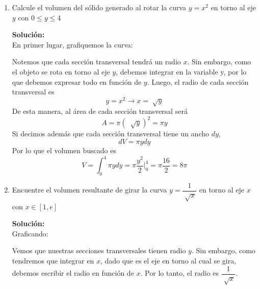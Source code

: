 \documentclass[12pt]{article}
\newenvironment{solucion}
{\begin{mdframed}[backgroundcolor=black!10]
		{\bf Solución:}\\
	}
	{
	\end{mdframed}
}
\newenvironment{preguntas}
{\begin{enumerate}\itemsep12pt
	}
	{
	\end{enumerate}
}
\newcommand{\ev}{\Big|}
\newcommand{\ra}{\rightarrow}
\begin{document}
\begin{preguntas}
\item Calcule el volumen del sólido generado al rotar la curva $y=x^2$ en torno al eje $y$ con $0 \leq y \leq 4$
\begin{solucion}
En primer lugar, grafiquemos la curva:
		\begin{center}
		\end{center}
	
		Notemos que cada sección transversal tendrá un radio $x$. Sin embargo, como el objeto se rota en torno al eje $y$, debemos integrar en la variable y, por lo que debemos expresar todo en función de $y$. Luego, el radio de cada sección transversal es 
		$$y = x^2 \ra x = \sqrt[]{y}$$
		De esta manera, al área de cada sección transversal será
		$$A = \pi (\ \sqrt[]{y})^2 = \pi y$$
		Si decimos además que cada sección transversal tiene un ancho $dy$,
		$$dV =  \pi y dy$$
	 	Por lo que el volumen buscado es
	 	$$V = \displaystyle \int_0^4 \pi y dy = \pi \dfrac{y^2}{2} \ev_0^4 = \pi \dfrac{16}{2} = 8 \pi$$
\end{solucion}
\item Encuentre el volumen resultante de girar la curva $y=\dfrac{1}{\sqrt[]{x}}$ en torno al eje $x$ con $x \in [1,e]$
\begin{solucion}
Graficando:
		\begin{center}
		\end{center}
		
		Vemos que nuestras secciones transversales tienen radio $y$. Sin embargo, como tendremos que integrar en $x$, dado que es el eje en torno al cual se gira, debemos escribir el radio en función de $x$. Por lo tanto, el radio es $\dfrac{1}{\sqrt[]{x}}$.
		

\end{solucion}
\end{preguntas}
\end{document}
